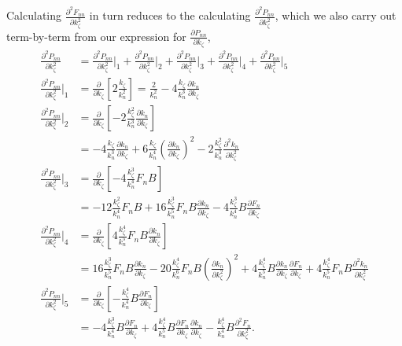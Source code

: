 \documentclass{article}
\begin{document}
Calculating $\frac{\partial^2 F_{nn}}{\partial k_{\zeta}^2}$ in turn reduces to the calculating $\frac{\partial^2 P_{nn}}{\partial k_{\zeta}^2}$, which we also carry out term-by-term from our expression for $\frac{\partial P_{nn}}{\partial k_{\zeta}}$,
\begin{align}
\frac{\partial^2 P_{nn}}{\partial k_{\zeta}^2} &= \frac{\partial^2 P_{nn}}{\partial k_{\zeta}^2}\bigg|_{1} + \frac{\partial^2 P_{nn}}{\partial k_{\zeta}^2}\bigg|_{2} + \frac{\partial^2 P_{nn}}{\partial k_{\zeta}^2}\bigg|_{3} + \frac{\partial^2 P_{nn}}{\partial k_{\zeta}^2}\bigg|_{4} + \frac{\partial^2 P_{nn}}{\partial k_{\zeta}^2}\bigg|_{5} \\
\frac{\partial^2 P_{nn}}{\partial k_{\zeta}^2}\bigg|_{1} &= \frac{\partial}{\partial k_{\zeta}} \left[2 \frac{k_{\zeta}}{k_{n}^2} \right] = \frac{2}{k_{n}^2} - 4 \frac{k_{\zeta}}{k_{n}^3} \frac{\partial k_{n}}{\partial k_{\zeta}} \\
\frac{\partial^2 P_{nn}}{\partial k_{\zeta}^2}\bigg|_{2} &= \frac{\partial}{\partial k_{\zeta}} \left[-2 \frac{k_{\zeta}^2}{k_{n}^3} \frac{\partial k_{n}}{\partial k_{\zeta}} \right] \\
&= - 4 \frac{k_{\zeta}}{k_{n}^3} \frac{\partial k_{n}}{\partial k_{\zeta}} + 6 \frac{k_{\zeta}}{k_{n}^4} \left(\frac{\partial k_{n}}{\partial k_{\zeta}} \right)^2 - 2 \frac{k_{\zeta}^2}{k_{n}^3} \frac{\partial^2 k_{n}}{\partial k_{\zeta}^2} \\
\frac{\partial^2 P_{nn}}{\partial k_{\zeta}^2}\bigg|_{3} &= \frac{\partial}{\partial k_{\zeta}} \left[-4 \frac{k_{\zeta}^3}{k_{n}^4} F_{n} B \right] \\
&= -12 \frac{k_{\zeta}^2}{k_{n}^4} F_{n} B + 16 \frac{k_{\zeta}^3}{k_{n}^5} F_{n} B \frac{\partial k_{n}}{\partial k_{\zeta}} - 4 \frac{k_{\zeta}^3}{k_{n}^4} B \frac{\partial F_{n}}{\partial k_{\zeta}} \\
\frac{\partial^2 P_{nn}}{\partial k_{\zeta}^2}\bigg|_{4} &= \frac{\partial}{\partial k_{\zeta}} \left[ 4 \frac{k_{\zeta}^4}{k_{n}^5} F_{n} B \frac{\partial k_{n}}{\partial k_{\zeta}} \right] \\
&= 16 \frac{k_{\zeta}^3}{k_{n}^5} F_{n} B \frac{\partial k_{n}}{\partial k_{\zeta}} - 20 \frac{k_{\zeta}^4}{k_{n}^6} F_{n} B \left( \frac{\partial k_{n}}{\partial k_{\zeta}^2} \right)^2 + 4 \frac{k_{\zeta}^4}{k_{n}^5} B \frac{\partial k_{n}}{\partial k_{\zeta}} \frac{\partial F_{n}}{\partial k_{\zeta}} + 4 \frac{k_{\zeta}^4}{k_{n}^5} F_{n} B \frac{\partial^2 k_{n}}{\partial k_{\zeta}^2} \\
\frac{\partial^2 P_{nn}}{\partial k_{\zeta}^2}\bigg|_{5} &= \frac{\partial}{\partial k_{\zeta}} \left[ - \frac{k_{\zeta}^4}{k_{n}^4} B \frac{\partial F_{n}}{\partial k_{\zeta}} \right] \\
&= -4 \frac{k_{\zeta}^3}{k_{n}^4} B \frac{\partial F_{n}}{\partial k_{\zeta}} + 4 \frac{k_{\zeta}^4}{k_{n}^5} B \frac{\partial F_{n}}{\partial k_{\zeta}} \frac{\partial k_{n}}{\partial k_{\zeta}} - \frac{k_{\zeta}^4}{k_{n}^4} B \frac{\partial^2 F_{n}}{\partial k_{\zeta}^2}.
\end{align}
\end{document}
